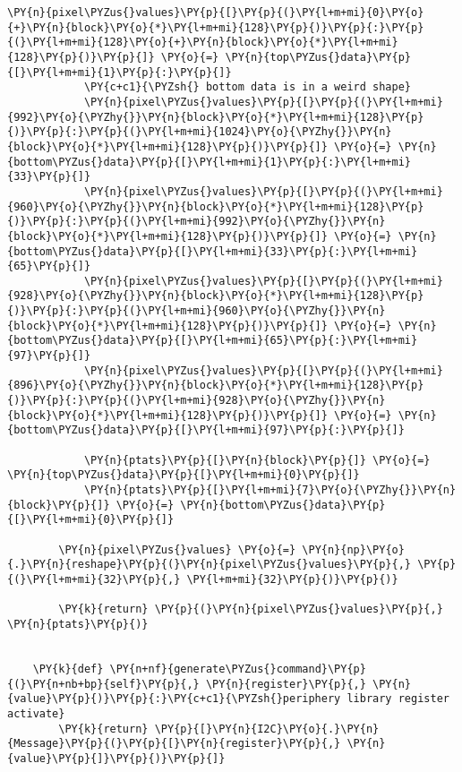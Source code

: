 \begin{tcolorbox}[breakable, size=fbox, boxrule=1pt, pad at break*=1mm,colback=cellbackground, colframe=cellborder]
\begin{Verbatim}[commandchars=\\\{\}]
			\PY{n}{pixel\PYZus{}values}\PY{p}{[}\PY{p}{(}\PY{l+m+mi}{0}\PY{o}{+}\PY{n}{block}\PY{o}{*}\PY{l+m+mi}{128}\PY{p}{)}\PY{p}{:}\PY{p}{(}\PY{l+m+mi}{128}\PY{o}{+}\PY{n}{block}\PY{o}{*}\PY{l+m+mi}{128}\PY{p}{)}\PY{p}{]} \PY{o}{=} \PY{n}{top\PYZus{}data}\PY{p}{[}\PY{l+m+mi}{1}\PY{p}{:}\PY{p}{]}
			\PY{c+c1}{\PYZsh{} bottom data is in a weird shape}
			\PY{n}{pixel\PYZus{}values}\PY{p}{[}\PY{p}{(}\PY{l+m+mi}{992}\PY{o}{\PYZhy{}}\PY{n}{block}\PY{o}{*}\PY{l+m+mi}{128}\PY{p}{)}\PY{p}{:}\PY{p}{(}\PY{l+m+mi}{1024}\PY{o}{\PYZhy{}}\PY{n}{block}\PY{o}{*}\PY{l+m+mi}{128}\PY{p}{)}\PY{p}{]} \PY{o}{=} \PY{n}{bottom\PYZus{}data}\PY{p}{[}\PY{l+m+mi}{1}\PY{p}{:}\PY{l+m+mi}{33}\PY{p}{]}
			\PY{n}{pixel\PYZus{}values}\PY{p}{[}\PY{p}{(}\PY{l+m+mi}{960}\PY{o}{\PYZhy{}}\PY{n}{block}\PY{o}{*}\PY{l+m+mi}{128}\PY{p}{)}\PY{p}{:}\PY{p}{(}\PY{l+m+mi}{992}\PY{o}{\PYZhy{}}\PY{n}{block}\PY{o}{*}\PY{l+m+mi}{128}\PY{p}{)}\PY{p}{]} \PY{o}{=} \PY{n}{bottom\PYZus{}data}\PY{p}{[}\PY{l+m+mi}{33}\PY{p}{:}\PY{l+m+mi}{65}\PY{p}{]}
			\PY{n}{pixel\PYZus{}values}\PY{p}{[}\PY{p}{(}\PY{l+m+mi}{928}\PY{o}{\PYZhy{}}\PY{n}{block}\PY{o}{*}\PY{l+m+mi}{128}\PY{p}{)}\PY{p}{:}\PY{p}{(}\PY{l+m+mi}{960}\PY{o}{\PYZhy{}}\PY{n}{block}\PY{o}{*}\PY{l+m+mi}{128}\PY{p}{)}\PY{p}{]} \PY{o}{=} \PY{n}{bottom\PYZus{}data}\PY{p}{[}\PY{l+m+mi}{65}\PY{p}{:}\PY{l+m+mi}{97}\PY{p}{]}
			\PY{n}{pixel\PYZus{}values}\PY{p}{[}\PY{p}{(}\PY{l+m+mi}{896}\PY{o}{\PYZhy{}}\PY{n}{block}\PY{o}{*}\PY{l+m+mi}{128}\PY{p}{)}\PY{p}{:}\PY{p}{(}\PY{l+m+mi}{928}\PY{o}{\PYZhy{}}\PY{n}{block}\PY{o}{*}\PY{l+m+mi}{128}\PY{p}{)}\PY{p}{]} \PY{o}{=} \PY{n}{bottom\PYZus{}data}\PY{p}{[}\PY{l+m+mi}{97}\PY{p}{:}\PY{p}{]}

			\PY{n}{ptats}\PY{p}{[}\PY{n}{block}\PY{p}{]} \PY{o}{=} \PY{n}{top\PYZus{}data}\PY{p}{[}\PY{l+m+mi}{0}\PY{p}{]}
			\PY{n}{ptats}\PY{p}{[}\PY{l+m+mi}{7}\PY{o}{\PYZhy{}}\PY{n}{block}\PY{p}{]} \PY{o}{=} \PY{n}{bottom\PYZus{}data}\PY{p}{[}\PY{l+m+mi}{0}\PY{p}{]}

		\PY{n}{pixel\PYZus{}values} \PY{o}{=} \PY{n}{np}\PY{o}{.}\PY{n}{reshape}\PY{p}{(}\PY{n}{pixel\PYZus{}values}\PY{p}{,} \PY{p}{(}\PY{l+m+mi}{32}\PY{p}{,} \PY{l+m+mi}{32}\PY{p}{)}\PY{p}{)}

		\PY{k}{return} \PY{p}{(}\PY{n}{pixel\PYZus{}values}\PY{p}{,} \PY{n}{ptats}\PY{p}{)}


	\PY{k}{def} \PY{n+nf}{generate\PYZus{}command}\PY{p}{(}\PY{n+nb+bp}{self}\PY{p}{,} \PY{n}{register}\PY{p}{,} \PY{n}{value}\PY{p}{)}\PY{p}{:}\PY{c+c1}{\PYZsh{}periphery library register activate}
		\PY{k}{return} \PY{p}{[}\PY{n}{I2C}\PY{o}{.}\PY{n}{Message}\PY{p}{(}\PY{p}{[}\PY{n}{register}\PY{p}{,} \PY{n}{value}\PY{p}{]}\PY{p}{)}\PY{p}{]}



\end{Verbatim}
\end{tcolorbox}
